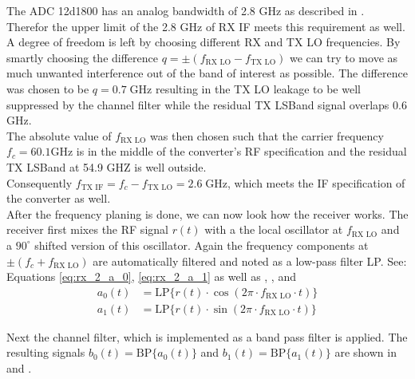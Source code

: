 The \gls{ADC} 12d1800 has an analog bandwidth of 2.8 GHz
as described in .
Therefor the upper limit of the 2.8 GHz of \gls{RX} \gls{IF} meets this
requirement as well. \\

A degree of freedom is left by choosing different \gls{RX} and \gls{TX}
\gls{LO} frequencies. By smartly choosing the difference 
$q = \pm \left(f_{\text{RX LO}} - f_{\text{TX LO}} \right)$ we can try
to move as much unwanted interference out of the band of interest
as possible.
The difference was chosen to be $q = 0.7 \;\text{GHz}$ resulting in the
\gls{TX} \gls{LO} leakage to be well suppressed by the channel filter while
the residual \gls{TX} \gls{LSBand} signal overlaps 0.6 GHz. \\

The absolute value of $f_{\text{RX LO}}$ was then chosen such that the
carrier frequency $f_c = 60.1 \text{GHz}$ is in the middle of the
converter's \gls{RF} specification and the residual \gls{TX} \gls{LSBand}
at 54.9 GHZ is well outside. \\

Consequently $f_{\text{TX IF}} = f_c - f_{\text{TX LO}} = 2.6 \;\text{GHz}$,
which meets the \gls{IF} specification of the converter as well. \\

After the frequency planing is done, we can now look how the receiver
works. The receiver first mixes the \gls{RF} signal $r(t)$ with a the local oscillator
at $f_{\text{RX LO}}$ and a $90^\circ$ shifted version of this oscillator.
Again the frequency components at $\pm (f_c + f_{\text{RX LO}})$ are
automatically filtered and noted as a low-pass filter LP.
See: Equations \eqref{eq:rx_2_a_0}, \eqref{eq:rx_2_a_1} as well as
, ,
 and  \\

\begin{subequations}
  \begin{alignat}{2}
    a_0(t) &= \text{LP}\{r(t) \cdot \cos(2\pi \cdot f_{\text{RX LO}} \cdot t)\}
    \label{eq:rx_2_a_0} \\
    a_1(t) &= \text{LP}\{r(t) \cdot \sin(2\pi \cdot f_{\text{RX LO}} \cdot t)\}
    \label{eq:rx_2_a_1}
  \end{alignat}
\end{subequations}

Next the channel filter, which is implemented as a band pass filter is applied.
The resulting signals $b_0(t) = \text{BP}\{a_0(t)\}$ and
$b_1(t) = \text{BP}\{a_1(t)\}$ are shown in 
and . \\

